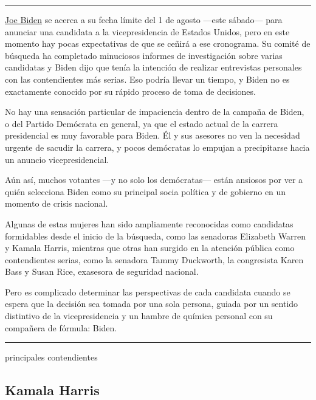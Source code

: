 \begin{center}\rule{0.5\linewidth}{\linethickness}\end{center}

\href{https://www.nytimes3xbfgragh.onion/es/interactive/2020/espanol/estados-unidos/joe-biden-elecciones.html}{Joe
Biden} se acerca a su fecha límite del 1 de agosto ---este sábado---
para anunciar una candidata a la vicepresidencia de Estados Unidos, pero
en este momento hay pocas expectativas de que se ceñirá a ese
cronograma. Su comité de búsqueda ha completado minuciosos informes de
investigación sobre varias candidatas y Biden dijo que tenía la
intención de realizar entrevistas personales con las contendientes más
serias. Eso podría llevar un tiempo, y Biden no es exactamente conocido
por su rápido proceso de toma de decisiones.

No hay una sensación particular de impaciencia dentro de la campaña de
Biden, o del Partido Demócrata en general, ya que el estado actual de la
carrera presidencial es muy favorable para Biden. Él y sus asesores no
ven la necesidad urgente de sacudir la carrera, y pocos demócratas lo
empujan a precipitarse hacia un anuncio vicepresidencial.

Aún así, muchos votantes ---y no solo los demócratas--- están ansiosos
por ver a quién selecciona Biden como su principal socia política y de
gobierno en un momento de crisis nacional.

Algunas de estas mujeres han sido ampliamente reconocidas como
candidatas formidables desde el inicio de la búsqueda, como las
senadoras Elizabeth Warren y Kamala Harris, mientras que otras han
surgido en la atención pública como contendientes serias, como la
senadora Tammy Duckworth, la congresista Karen Bass y Susan Rice,
exasesora de seguridad nacional.

Pero es complicado determinar las perspectivas de cada candidata cuando
se espera que la decisión sea tomada por una sola persona, guiada por un
sentido distintivo de la vicepresidencia y un hambre de química personal
con su compañera de fórmula: Biden.

\begin{center}\rule{0.5\linewidth}{\linethickness}\end{center}

principales contendientes

\hypertarget{kamala-harris}{%
\subsection{Kamala Harris}\label{kamala-harris}}

